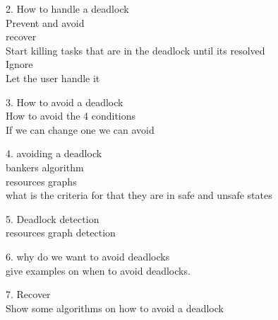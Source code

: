 \documentclass[a4paper,10pt,titlepage]{report}
\begin{document}
2.  How to handle a deadlock \\
\hspace{10mm} Prevent and avoid \\
\hspace{10mm} recover \\
\hspace{15mm} Start killing tasks that are in the deadlock until its resolved \\
\hspace{10mm} Ignore \\
\hspace{15mm} Let the user handle it \\
\vspace{5mm}

3. How to avoid a deadlock \\
\hspace{10mm} How to avoid the 4 conditions \\
\hspace{15mm} If we can change one we can avoid \\
\vspace{5mm}

4. avoiding a deadlock \\
\hspace{10mm} bankers algorithm \\
\hspace{10mm} resources graphs \\
\hspace{10mm} what is the criteria for that they are in safe and unsafe states \\
\vspace{5mm}


5. Deadlock detection  \\
\hspace{10mm} resources graph detection \\
\vspace{5mm}



6. why do we want to avoid deadlocks\\
\hspace{10mm} give examples on when to avoid deadlocks.
\vspace{5mm}

7. Recover \\
\hspace{10mm} Show some algorithms on how to avoid a deadlock \\
\vspace{5mm}
\end{document}
